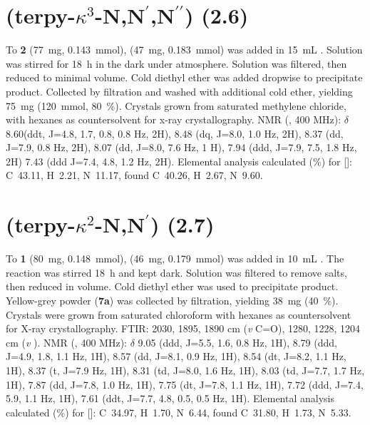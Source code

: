 \section{(terpy-$\kappa^3$-N,N$^\prime$,N$^{\prime \prime}$) (2.6)} \label{sec.c6}
To \textbf{2} (77~mg,  0.143~mmol),  (47~mg,  0.183~mmol) was added in 15~mL . Solution was stirred for 18~h in the dark under  atmosphere. Solution was filtered, then reduced to minimal volume. Cold diethyl ether was added dropwise to precipitate product. Collected by filtration and washed with additional cold ether, yielding 75~mg (120~mmol, 80~\%).  Crystals grown from saturated methylene chloride, with hexanes as countersolvent for x-ray crystallography.  NMR (, 400 MHz): $\delta$ 8.60(ddt, J=4.8, 1.7, 0.8, 0.8 Hz, 2H), 8.48 (dq, J=8.0, 1.0 Hz, 2H), 8.37 (dd, J=7.9, 0.8 Hz, 2H), 8.07 (dd, J=8.0, 7.6 Hz, 1 H), 7.94 (ddd, J=7.9, 7.5, 1.8 Hz, 2H) 7.43 (ddd J=7.4, 4.8, 1.2 Hz, 2H). Elemental analysis calculated (\%) for []: C~43.11, H~2.21, N~11.17, found C~40.26, H~2.67, N~9.60.


\section{(terpy-$\kappa^2$-N,N$^\prime$) (2.7)}\label{sec.c7}
To \textbf{1} (80~mg, 0.148~mmol),  (46~mg, 0.179~mmol) was added in 10~mL . The reaction was stirred 18~h and kept dark. Solution was filtered to remove salts, then reduced in volume. Cold diethyl ether was used to precipitate product. Yellow-grey powder (\textbf{7a}) was collected by filtration, yielding 38~mg (40~\%). Crystals were grown from saturated chloroform with hexanes as countersolvent for X-ray crystallography. FTIR: 2030, 1895, 1890 cm (\textit{v} C=O), 1280, 1228, 1204 cm (\textit{v} ).  NMR (, 400 MHz): $\delta$ 9.05 (ddd, J=5.5, 1.6, 0.8 Hz, 1H), 8.79 (ddd, J=4.9, 1.8, 1.1 Hz, 1H), 8.57 (dd, J=8.1, 0.9 Hz, 1H), 8.54 (dt, J=8.2, 1.1 Hz, 1H), 8.37 (t, J=7.9 Hz, 1H), 8.31 (td, J=8.0, 1.6 Hz, 1H), 8.03 (td, J=7.7, 1.7 Hz, 1H), 7.87 (dd, J=7.8, 1.0 Hz, 1H), 7.75 (dt, J=7.8, 1.1 Hz, 1H), 7.72 (ddd, J=7.4, 5.9, 1.1 Hz, 1H), 7.61 (ddt, J=7.7, 4.8, 0.5, 0.5 Hz, 1H).  Elemental analysis calculated (\%) for []: C~34.97, H~1.70, N~6.44, found C~31.80, H~1.73, N~5.33.

